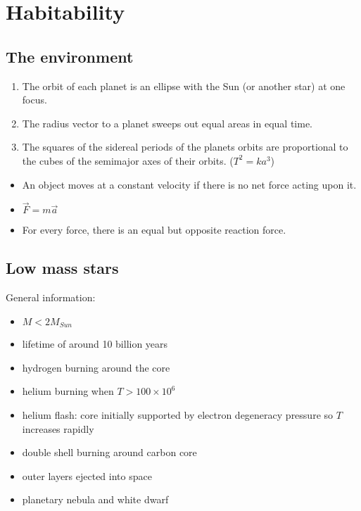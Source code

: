 \documentclass{article}
\theoremstyle{sltheorem}
\begin{document}
\section{Habitability}
\subsection{The environment}
\begin{enumerate}
    \item The orbit of each planet is an ellipse with the Sun (or another star) at one focus.
    \item The radius vector to a planet sweeps out equal areas in equal time.
    \item The squares of the sidereal periods of the planets orbits are proportional to the cubes of the semimajor axes of their orbits. ($T^2=ka^3$)
\end{enumerate}
\begin{itemize}
    \item An object moves at a constant velocity if there is no net force acting upon it.
    \item $\vec F = m \vec a$
    \item For every force, there is an equal but opposite reaction force.
\end{itemize}
\subsection{Low mass stars}
General information:
\begin{itemize}
    \item $M < 2M_{Sun}$
    \item lifetime of around 10 billion years
    \item hydrogen burning around the core
    \item helium burning when $T > 100 \times 10^6$
    \item helium flash: core initially supported by electron degeneracy pressure so $T$ increases rapidly
    \item double shell burning around carbon core
    \item outer layers ejected into space
    \item planetary nebula and white dwarf
\end{itemize}
\end{document}
